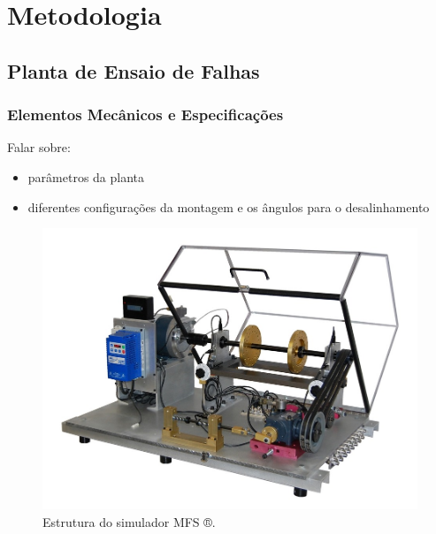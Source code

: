 
\chapter{Metodologia}


% 

\section{Planta de Ensaio de Falhas}



%

\subsection{Elementos Mecânicos e Especificações}


Falar sobre: 
\begin{itemize}
    \item parâmetros da planta
    \item diferentes configurações da montagem e os ângulos para o desalinhamento
\end{itemize}

\begin{figure}[H]
    \caption{Estrutura do simulador MFS ®.}
    \begin{center}
        \includegraphics[scale=.4]{metodologia/img/real_plant}
    \end{center}
    \label{fig:satelite_completo}
\end{figure}


